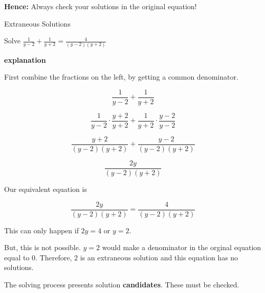 \documentclass{ximera}
\begin{document}
\textbf{Hence:} Always check your solutions in the original equation!







\begin{example} Extraneous Solutions


Solve $\frac{1}{y-2} + \frac{1}{y+2} = \frac{4}{(y-2)(y+2)}$


\textbf{\textcolor{red!75!green}{explanation}} 



First combine the fractions on the left, by getting a common denominator.



\[    \frac{1}{y-2} + \frac{1}{y+2}        \]

\[    \frac{1}{y-2} \cdot \frac{y+2}{y+2} + \frac{1}{y+2}  \cdot \frac{y-2}{y-2}       \]

\[    \frac{y+2}{(y-2)(y+2)} + \frac{y-2}{(y-2)(y+2)}      \]

\[    \frac{2y}{(y-2)(y+2)}     \]

Our equivalent equation is


\[    \frac{2y}{(y-2)(y+2)}   = \frac{4}{(y-2)(y+2)}   \]


This can only happen if $2y = 4$ or $y = 2$.

But, this is not possible.  $y=2$ would make a denominator in the orginal equation equal to $0$.  Therefore, $2$ is an extraneous solution and this equation has no solutions.




\end{example}



The solving process presents solution \textbf{candidates}.  These must be checked.
\end{document}
